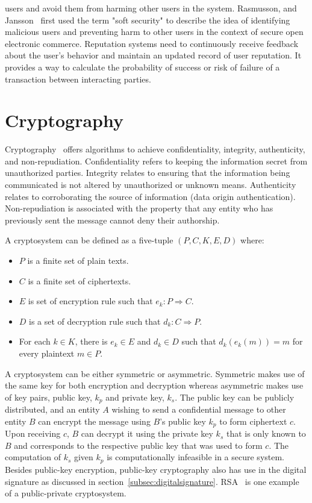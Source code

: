 users and avoid them from harming other users in the system. Rasmusson, and
Jansson~\cite{rasmusson1996simulated} first used the term "soft security" to
describe the idea of identifying malicious users and preventing harm to other
users in the context of secure open electronic commerce. Reputation systems
need to continuously receive feedback about the user's behavior and maintain an
updated record of user reputation. It provides a way to calculate the
probability of success or risk of failure of a transaction between interacting
parties.
\section{Cryptography} \label{sec:cryptography}
Cryptography~\cite{katz1996handbook} offers algorithms to achieve
confidentiality, integrity, authenticity, and non-repudiation. Confidentiality
refers to keeping the information secret from unauthorized parties. Integrity
relates to ensuring that the information being communicated is not altered by
unauthorized or unknown means. Authenticity relates to corroborating the source
of information (data origin authentication). Non-repudiation is associated with
the property that any entity who has previously sent the message cannot deny
their authorship.  \par
A cryptosystem can be defined as a five-tuple $(P, C, K, E, D)$ where: 
\begin{itemize}
	\item $P$ is a finite set of plain texts.
	\item $C$ is a finite set of ciphertexts.
	\item $E$ is set of encryption rule such that $e_{k}:P \Rightarrow C$.
	\item $D$ is a set of decryption rule such that $d_{k}:C \Rightarrow P$. 
	\item For each $k \in K$, there is $e_k \in E$ and $d_k \in D$ such that
		$d_k(e_k(m)) = m$ for every plaintext $m \in P$.
\end{itemize}
A cryptosystem can be either symmetric or asymmetric. Symmetric makes use of
the same key for both encryption and decryption whereas asymmetric makes use of
key pairs, public key, $k_{p}$ and private key, $k_{s}$. The public key can be
publicly distributed, and an entity $A$ wishing to send a confidential message
to other entity $B$ can encrypt the message using $B$'s public key $k_{p}$ to
form ciphertext $c$. Upon receiving $c$, $B$ can decrypt it using the private
key $k_{s}$ that is only known to $B$ and corresponds to the respective public
key that was used to form $c$. The computation of $k_{s}$ given $k_{p}$ is
computationally infeasible in a secure system. Besides public-key encryption,
public-key cryptography also has use in the digital signature as discussed in
section~\ref{subsec:digitalsignature}. RSA~\cite{rivest1978method} is one
example of a public-private cryptosystem.

